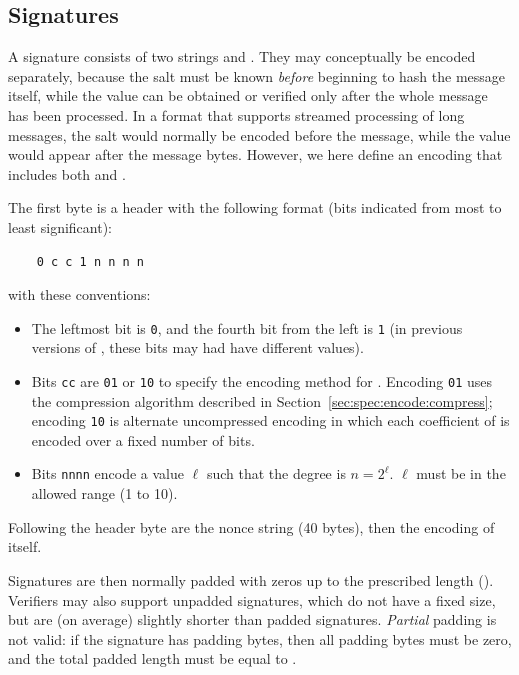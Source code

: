 \subsection{Signatures}

A \falcon signature consists of two strings \salt and \comps. They may
conceptually be encoded separately, because the salt \salt must be known
\emph{before} beginning to hash the message itself, while the \comps
value can be obtained or verified only after the whole message has been
processed. In a format that supports streamed processing of long
messages, the salt \salt would normally be encoded before the message,
while the \comps value would appear after the message bytes. However,
we here define an encoding that includes both \salt and \comps.

The first byte is a header with the following format (bits indicated
from most to least significant):
\begin{verbatim}
    0 c c 1 n n n n
\end{verbatim}
with these conventions:
\begin{itemize}

    \item The leftmost bit is \texttt{0}, and the fourth bit from the left
    is \texttt{1} (in previous versions of \falcon, these bits may had
    have different values).

    \item Bits \texttt{cc} are \texttt{01} or \texttt{10} to specify the
    encoding method for \comps. Encoding \texttt{01} uses the compression
    algorithm described in Section~\ref{sec:spec:encode:compress};
    encoding \texttt{10} is alternate uncompressed encoding in which each
    coefficient of \comps is encoded over a fixed number of bits.

    \item Bits \texttt{nnnn} encode a value $\ell$ such that the
    \falcon degree is $n = 2^\ell$. $\ell$ must be in the allowed
    range (1 to 10).

\end{itemize}

Following the header byte are the nonce string \salt (40 bytes), then
the encoding of \comps itself.

Signatures are then normally padded with zeros up to the prescribed
length (\sigbytelen). Verifiers may also support unpadded signatures,
which do not have a fixed size, but are (on average) slightly shorter
than padded signatures. \emph{Partial} padding is not valid: if the
signature has padding bytes, then all padding bytes must be zero, and
the total padded length must be equal to \sigbytelen.

